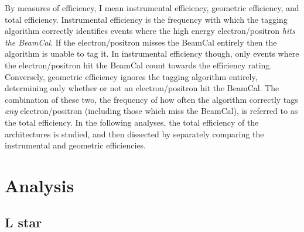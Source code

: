 \documentclass{report}
\begin{document}
                    By measures of efficiency, I mean instrumental efficiency, geometric efficiency, and total efficiency. Instrumental efficiency is the frequency with which the tagging algorithm correctly identifies events where the high energy electron/positron \textit{hits the BeamCal}. If the electron/positron misses the BeamCal entirely then the algorithm is unable to tag it. In instrumental efficiency though, only events where the electron/positron hit the BeamCal count towards the efficiency rating. Conversely, geometric efficiency ignores the tagging algorithm entirely, determining only whether or not an electron/positron hit the BeamCal. The combination of these two, the frequency of how often the algorithm correctly tags \textit{any} electron/positron (including those which miss the BeamCal), is referred to as the total efficiency. In the following analyses, the total efficiency of the architectures is studied, and then dissected by separately comparing the instrumental and geometric efficiencies.





    \chapter{Analysis}
        \section{L star}
\end{document}
